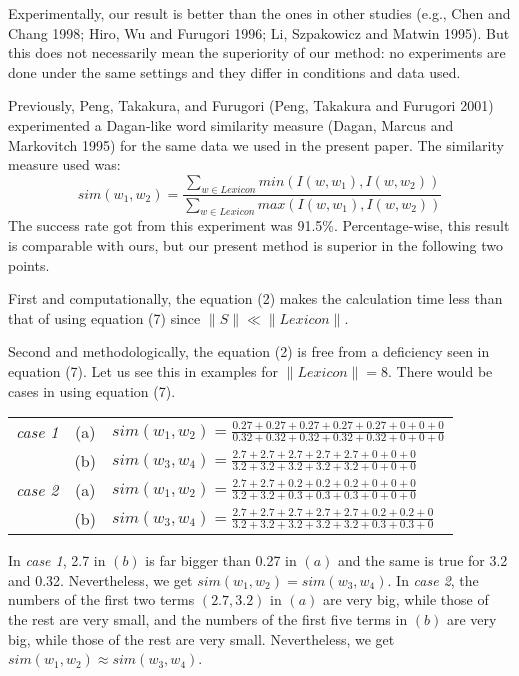 Experimentally, our result is better than the ones in other studies 
(e.g., Chen and Chang 1998; Hiro, Wu and Furugori 1996; Li, Szpakowicz and Matwin 1995).  But this 
does not necessarily mean the superiority of our method: no experiments are done under the same 
settings and they differ in conditions and data used.

Previously, Peng, Takakura, and Furugori (Peng, Takakura and Furugori 2001) experimented
 a Dagan-like word similarity 
measure (Dagan, Marcus and Markovitch 1995) for the same data we used in the present paper.  The similarity measure used was:
\begin{equation}
sim(w_1,w_2)=\frac{\sum_{w \in Lexicon}min(I(w,w_1),I(w,w_2))}{\sum_{w \in Lexicon}max(I(w,w_1),I(w,w_2))}
\end{equation}
The success rate got from this experiment was 91.5\%.  Percentage-wise, this result is 
comparable with ours, but our present method is superior in the following two points.

First and computationally, the equation (2) makes the calculation time less than that of 
using equation (7) since $\|S\| \ll \|Lexicon\|$.

Second and methodologically, the equation (2) is free from a deficiency seen in 
equation (7).  Let us see this in examples for $\|Lexicon\|=8$.  There would be cases in
 using equation (7).
\begin{center} 
  \begin{tabular}{ccl} 
    {\it case 1} & (a) & $sim(w_1,w_2)=\frac{0.27+0.27+0.27+0.27+0.27+0+0+0}{0.32+
       0.32+0.32+0.32+0.32+0+0+0}$ \\
                    & (b) & $sim(w_3,w_4)=\frac{2.7+2.7+2.7+2.7+2.7+0+0+0}{3.2+3.2+3.2
       +3.2+3.2+0+0+0}$ \\
    {\it case 2} & (a) & $sim(w_1,w_2)=\frac{2.7+2.7+0.2+0.2+0.2+0+0+0}{3.2+
       3.2+0.3+0.3+0.3+0+0+0}$ \\
                    & (b) & $sim(w_3,w_4)=\frac{2.7+2.7+2.7+2.7+2.7+0.2+0.2+0}{3.2+3.2+3.2
       +3.2+3.2+0.3+0.3+0}$ \\
   \end{tabular}
\end{center}
\vspace{0.3cm}


In {\it case 1}, 2.7 in $(b)$ is far bigger than 0.27 in $(a)$ and the same 
is true for 3.2 and 0.32.  Nevertheless, we get $sim(w_1,w_2)=sim(w_3,w_4)$.  
In {\it case 2}, the numbers of the first two terms $(2.7,3.2)$ in $(a)$  are 
very big, while those of the rest are very small, and the numbers of the first five terms 
in $(b)$ are very big, while those of the rest are very small.  Nevertheless, 
we get $sim(w_1,w_2) \approx sim(w_3,w_4)$.

